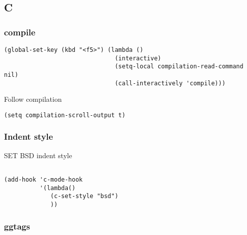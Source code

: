 \documentclass[12pt]{article}
\begin{document}
\subsection{C}
\label{sec:org3e6a207}
\subsubsection{compile}
\label{sec:org4cf42cd}

\begin{verbatim}
(global-set-key (kbd "<f5>") (lambda ()
                               (interactive)
                               (setq-local compilation-read-command nil)
                               (call-interactively 'compile)))

\end{verbatim}

Follow compilation

\begin{verbatim}
(setq compilation-scroll-output t)
\end{verbatim}


\subsubsection{Indent style}
\label{sec:org7e7cfd8}

SET BSD indent style

\begin{verbatim}

(add-hook 'c-mode-hook
          '(lambda()
             (c-set-style "bsd")
             ))
\end{verbatim}


\subsubsection{ggtags}
\label{sec:org8c0d199}
\end{document}
